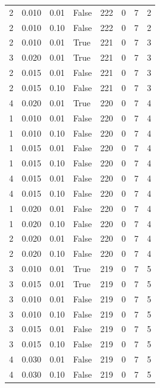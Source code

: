 \documentclass[a4paper,twoside,12pt]{book}
\begin{document}
\begin{table}
\begin{tabular}{rrrlrrrr}
				2 &  0.010 &     0.01 &    False &  222 &  0 &   7 &   2 \\
				2 &  0.010 &     0.10 &    False &  222 &  0 &   7 &   2 \\
				2 &  0.010 &     0.01 &     True &  221 &  0 &   7 &   3 \\
				3 &  0.020 &     0.01 &     True &  221 &  0 &   7 &   3 \\
				2 &  0.015 &     0.01 &    False &  221 &  0 &   7 &   3 \\
				2 &  0.015 &     0.10 &    False &  221 &  0 &   7 &   3 \\
				4 &  0.020 &     0.01 &     True &  220 &  0 &   7 &   4 \\
				1 &  0.010 &     0.01 &    False &  220 &  0 &   7 &   4 \\
				1 &  0.010 &     0.10 &    False &  220 &  0 &   7 &   4 \\
				1 &  0.015 &     0.01 &    False &  220 &  0 &   7 &   4 \\
				1 &  0.015 &     0.10 &    False &  220 &  0 &   7 &   4 \\
				4 &  0.015 &     0.01 &    False &  220 &  0 &   7 &   4 \\
				4 &  0.015 &     0.10 &    False &  220 &  0 &   7 &   4 \\
				1 &  0.020 &     0.01 &    False &  220 &  0 &   7 &   4 \\
				1 &  0.020 &     0.10 &    False &  220 &  0 &   7 &   4 \\
				2 &  0.020 &     0.01 &    False &  220 &  0 &   7 &   4 \\
				2 &  0.020 &     0.10 &    False &  220 &  0 &   7 &   4 \\
				3 &  0.010 &     0.01 &     True &  219 &  0 &   7 &   5 \\
				3 &  0.015 &     0.01 &     True &  219 &  0 &   7 &   5 \\
				3 &  0.010 &     0.01 &    False &  219 &  0 &   7 &   5 \\
				3 &  0.010 &     0.10 &    False &  219 &  0 &   7 &   5 \\
				3 &  0.015 &     0.01 &    False &  219 &  0 &   7 &   5 \\
				3 &  0.015 &     0.10 &    False &  219 &  0 &   7 &   5 \\
				4 &  0.030 &     0.01 &    False &  219 &  0 &   7 &   5 \\
				4 &  0.030 &     0.10 &    False &  219 &  0 &   7 &   5 \\

\end{tabular}
\end{table}
\end{document}
